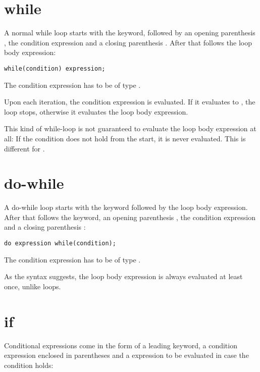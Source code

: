 \section{while}
\label{expression-while}

A normal while loop starts with the  keyword, followed by an opening parenthesis \expr{(}, the condition expression and a closing parenthesis \expr{)}. After that follows the loop body expression:

\begin{lstlisting}
while(condition) expression;
\end{lstlisting}

The condition expression has to be of type .

Upon each iteration, the condition expression is evaluated. If it evaluates to , the loop stops, otherwise it evaluates the loop body expression.


This kind of while-loop is not guaranteed to evaluate the loop body expression at all: If the condition does not hold from the start, it is never evaluated. This is different for .

\section{do-while}
\label{expression-do-while}

A do-while loop starts with the  keyword followed by the loop body expression. After that follows the  keyword, an opening parenthesis \expr{(}, the condition expression and a closing parenthesis \expr{)}:

\begin{lstlisting}
do expression while(condition);
\end{lstlisting}

The condition expression has to be of type .

As the syntax suggests, the loop body expression is always evaluated at least once, unlike  loops.

\section{if}
\label{expression-if}

Conditional expressions come in the form of a leading  keyword, a condition expression enclosed in parentheses \expr{()} and a expression to be evaluated in case the condition holds:

